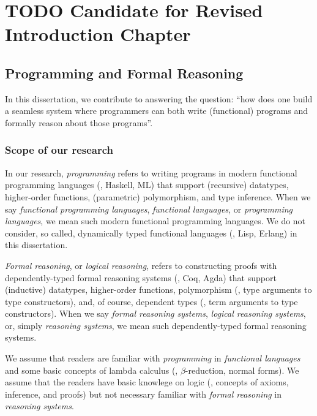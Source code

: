 \chapter{TODO Candidate for Revised Introduction Chapter}
\label{APP:ch:intro}

\section{Programming and Formal Reasoning}\label{APP:sec:intro:motiv}
In this dissertation, we contribute to answering the question:
``how does one build a seamless system where programmers can both
write (functional) programs and formally reason about those programs''.

\subsection*{Scope of our research}
In our research, \emph{programming} refers to writing programs in
modern functional programming languages (\eg, Haskell, ML) that support
(recursive) datatypes, higher-order functions, (parametric) polymorphism,
and type inference. When we say \emph{functional programming languages},
\emph{functional languages}, or \emph{programming languages},
we mean such modern functional programming languages. We do not consider,
so called, dynamically typed functional languages (\eg, Lisp, Erlang)
in this dissertation.

\emph{Formal reasoning}, or \emph{logical reasoning},
refers to constructing proofs with dependently-typed formal reasoning systems
(\eg, Coq, Agda) that support (inductive) datatypes, higher-order functions,
polymorphism (\ie, type arguments to type constructors), and, of course,
dependent types (\ie, term arguments to type constructors). When we say
\emph{formal reasoning systems}, \emph{logical reasoning systems},
or, simply \emph{reasoning systems}, we mean such dependently-typed
formal reasoning systems.

We assume that readers are familiar with \emph{programming}
in \emph{functional languages} and some basic concepts of lambda calculus
(\eg, $\beta$-reduction, normal forms). We assume that the readers have
basic knowlege on logic (\eg, concepts of axioms, inference, and proofs)
but not necessary familiar with \emph{formal reasoning}
in \emph{reasoning systems}.

